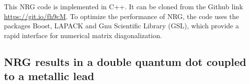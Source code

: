  This NRG code is implemented in C++. It can be cloned from the Github link \url{https://git.io/fh9cM}.  To optimize the performance of NRG, the code uses the packages Boost, LAPACK and Gnu Scientific Library (GSL), which provide a rapid interface for numerical matrix diagonalization. 
 


\subsection{NRG results in a double quantum dot coupled to a metallic lead\label{sec: NRG-DQD}}

\begin{figure}[bt]
     \centering
      \\

\end{figure}
